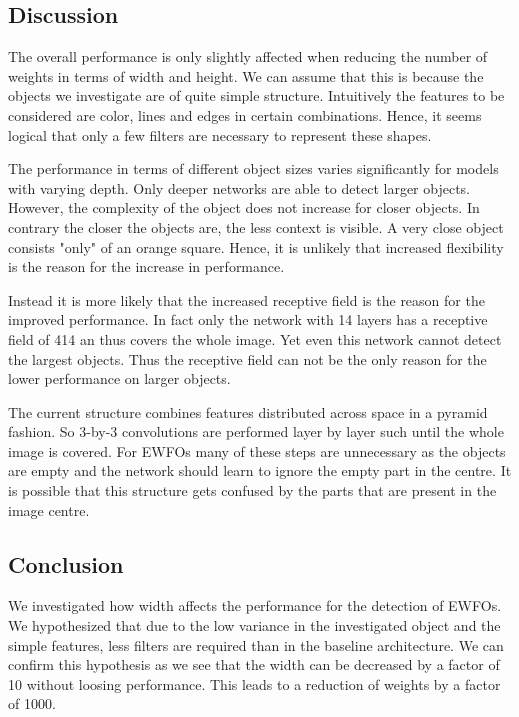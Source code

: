 	\subsection{Discussion}
	
	The overall performance is only slightly affected when reducing the number of weights in terms of width and height. We can assume that this is because the objects we investigate are of quite simple structure. Intuitively the features to be considered are color, lines and edges in certain combinations. Hence, it seems logical that only a few filters are necessary to represent these shapes.
	
	The performance in terms of different object sizes varies significantly for models with varying depth. Only deeper networks are able to detect larger objects. However, the complexity of the object does not increase for closer objects. In contrary the closer the objects are, the less context is visible. A very close object consists "only" of an orange square. Hence, it is unlikely that increased flexibility is the reason for the increase in performance. 
	
	Instead it is more likely that the increased receptive field is the reason for the improved performance. In fact only the network with 14 layers has a receptive field of 414 an thus covers the whole image. Yet even this network cannot detect the largest objects. Thus the receptive field can not be the only reason for the lower performance on larger objects.
	
	 The current structure combines features distributed across space in a pyramid fashion. So 3-by-3 convolutions are performed layer by layer such until the whole image is covered. For \acp{EWFO} many of these steps are unnecessary as the objects are empty and the network should learn to ignore the empty part in the centre. It is possible that this structure gets confused by the parts that are present in the image centre.
	
	\subsection{Conclusion}
	
	We investigated how width affects the performance for the detection of \acp{EWFO}. We hypothesized that due to the low variance in the investigated object and the simple features, less filters are required than in the baseline architecture. We can confirm this hypothesis as we see that the width can be decreased by a factor of 10 without loosing performance. This leads to a reduction of weights by a factor of 1000. 
	
